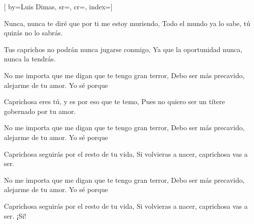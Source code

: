 [
        by={Luis Dimas},
        sr={},
        cr={},
        index={}]

\beginverse
Nunca, nunca te diré
que por ti me estoy muriendo,
Todo el mundo ya lo sabe, 
tú quizás no lo sabrás.
\endverse

\beginverse
Tus caprichos no podrán nunca jugarse conmigo,
Ya que la oportunidad nunca, nunca la tendrás.
\endverse

\beginverse
No me importa que me digan
que te tengo gran terror,
Debo ser más precavido, alejarme de tu amor.
Yo sé porque
\endverse

\beginverse
Caprichosa eres tú, 
y es por eso que te temo,
Pues no quiero ser un títere
gobernado por tu amor.
\endverse

\beginverse
No me importa que me digan
que te tengo gran terror,
Debo ser más precavido, alejarme de tu amor.
Yo sé porque
\endverse

\beginverse
Caprichosa seguirás por el resto de tu vida,
Si volvieras a nacer, caprichosa vas a ser.
\endverse

\beginverse
No me importa que me digan
que te tengo gran terror,
Debo ser más precavido, alejarme de tu amor.
Yo sé porque
\endverse

\beginverse
Caprichosa seguirás por el resto de tu vida,
Si volvieras a nacer, caprichosa vas a ser.
¡Si!
\endverse

\endsong